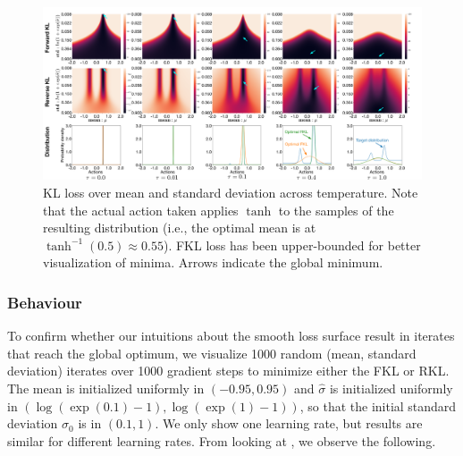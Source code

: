 \documentclass[twoside,11pt]{article}
\begin{document}
\begin{figure}[!htb]
    \centering
    \includegraphics[width=0.99\columnwidth]{figs/bandit/trueQ/heatmaps/heatmap_combined.pdf}
    \caption{KL loss over mean and standard deviation across temperature. Note that the actual action taken applies $\tanh$ to the samples of the resulting distribution (i.e., the optimal mean is at $\tanh^{-1}(0.5) \approx 0.55$). FKL loss has been upper-bounded for better visualization of minima. Arrows indicate the global minimum.}
    \label{fig:bandit-heatmap}
\end{figure}

  

\subsubsection{Behaviour}
To confirm whether our intuitions about the smooth loss surface result in iterates that reach the global optimum, we visualize 1000 random (mean, standard deviation) iterates over 1000 gradient steps to minimize either the FKL or RKL. The mean is initialized uniformly in $(-0.95, 0.95)$ and $\hat{\sigma}$ is initialized uniformly in $(\log(\exp(0.1) - 1), \log(\exp(1) - 1))$, so that the initial standard deviation $\sigma_0$ is in $(0.1, 1)$. We only show one learning rate, but results are similar for different learning rates. From looking at , we observe the following.
\end{document}
